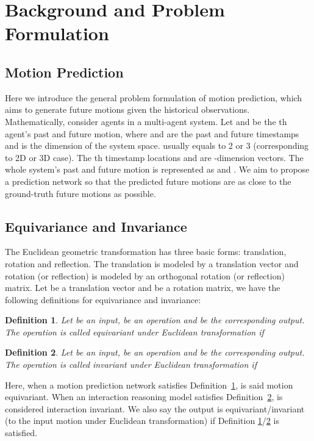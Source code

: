 \documentclass[10pt,twocolumn,letterpaper]{article}
\newtheorem{definition}{Definition}
\begin{document}
\vspace{-1mm}
\section{Background and Problem Formulation}
\vspace{-1mm}
\subsection{Motion Prediction}
\vspace{-1mm}
Here we introduce the general problem formulation of motion prediction, which aims to generate future motions given the historical observations. Mathematically, consider  agents in a multi-agent system. Let  and  be the th agent's past and future motion, where  and  are the past and future timestamps and  is the dimension of the system space.  usually equals to 2 or 3 (corresponding to 2D or 3D case). The th timestamp locations  and  are -dimension vectors. The whole system's past and future motion is represented as  and . We aim to propose a prediction network  so that the predicted future motions  are as close to the ground-truth future motions  as possible.

\subsection{Equivariance and Invariance}
\vspace{-1mm}
The Euclidean geometric transformation has three basic forms: translation, rotation and reflection. The translation is modeled by a translation vector and rotation (or reflection) is modeled by an orthogonal rotation (or reflection) matrix. Let  be a translation vector  and  be a  rotation  matrix, we have the following definitions for equivariance and invariance:
\vspace{-1.5mm}
\begin{definition}
\label{def:equivariance}
Let  be an input,  be an operation and  be the corresponding output. The operation  is called equivariant under Euclidean transformation if

\vspace{-3mm}
\end{definition}
\begin{definition}
\vspace{-4mm}
\label{def:invariance}
Let  be an input,  be an operation and  be the corresponding output. The operation  is called invariant under Euclidean transformation if

\end{definition}
\vspace{-2mm}
Here, when a motion prediction network  satisfies Definition~\ref{def:equivariance},  is said motion equivariant. When an interaction reasoning model  satisfies Definition~\ref{def:invariance},  is considered interaction invariant. We also say the output  is equivariant/invariant (to the input motion under Euclidean transformation) if Definition 
\ref{def:equivariance}/\ref{def:invariance} is satisfied.
\end{document}

